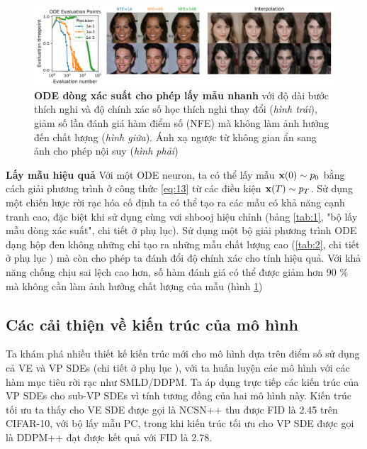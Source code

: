 \documentclass{article} %
\begin{document}
\begin{figure}[h!]
    \centering
    \includegraphics[width=0.9\linewidth]{figures/3.png}
    \caption{\textbf{ODE dòng xác suất cho phép lấy mẫu nhanh} với độ dài bước thích nghi và độ chính xác số học thích nghi thay đổi (\textit{hình trái}), giảm số lần đánh giá hàm điểm số (NFE) mà không làm ảnh hưởng đến chất lượng (\textit{hình giữa}).
    Ánh xạ ngược từ không gian ẩn sang ảnh cho phép nội suy (\textit{hình phải})}
    \label{fig:3}
\end{figure}

\textbf{Lấy mẫu hiệu quả} Với một ODE neuron, ta có thể lấy mẫu $\bold{x}(0) \sim p_0$ bằng cách giải phương trình ở công thức \ref{eq:13} từ các điều kiện $\bold{x}(T) \sim p_T$.
Sử dụng một chiến lược rời rạc hóa cố định ta có thể tạo ra các mẫu có khả năng cạnh tranh cao, đặc biệt khi sử dụng cùng vơi shbooj hiệu chỉnh (bảng \ref{tab:1}, "bộ lấy mẫu dòng xác suất", chi tiết ở phụ lục).
Sử dụng một bộ giải phương trình ODE dạng hộp đen \citep{dormand1980family} không những chỉ tạo ra những mẫu chất lượng cao (\ref{tab:2}, chi tiết ở phụ lục ) mà còn cho phép ta đánh đổi độ chính xác cho tính hiệu quả.
Với khả năng chống chịu sai lệch cao hơn, số hàm đánh giá có thể được giảm hơn 90 \% mà không cần làm ảnh hưởng chất lượng của mẫu (hình \ref{fig:3})

\subsection{Các cải thiện về kiến trúc của mô hình}

Ta khám phá nhiều thiết kế kiến trúc mới cho mô hình dựa trên điểm số sử dụng cả VE và VP SDEs (chi tiết ở phụ lục ), với ta huấn luyện các mô hình với các hàm mục tiêu rời rạc như SMLD/DDPM.
Ta áp dụng trực tiếp các kiến trúc của VP SDEs cho sub-VP SDEs vì tính tương đồng của hai mô hình này.
Kiến trúc tối ưu ta thấy cho VE SDE được gọi là NCSN++ thu được FID là 2.45 trên CIFAR-10, với bộ lấy mẫu PC, trong khi kiến trúc tối ưu cho VP SDE được gọi là DDPM++ đạt được kết quả với FID là 2.78.
\end{document}
